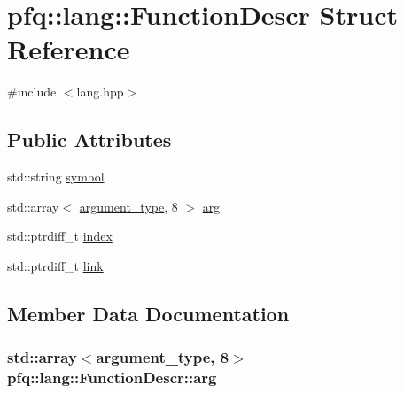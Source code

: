 \hypertarget{structpfq_1_1lang_1_1FunctionDescr}{}\section{pfq\+:\+:lang\+:\+:Function\+Descr Struct Reference}
\label{structpfq_1_1lang_1_1FunctionDescr}


{\ttfamily \#include $<$lang.\+hpp$>$}

\subsection*{Public Attributes}
\begin{DoxyCompactItemize}
\item 
std\+::string \hyperlink{structpfq_1_1lang_1_1FunctionDescr_a21f51c65f55dddd54de1171d8914c030}{symbol}
\item 
std\+::array$<$ \hyperlink{structpfq_1_1lang_1_1argument__type}{argument\+\_\+type}, 8 $>$ \hyperlink{structpfq_1_1lang_1_1FunctionDescr_af1fe3a86f26dc3f74532ce718a195006}{arg}
\item 
std\+::ptrdiff\+\_\+t \hyperlink{structpfq_1_1lang_1_1FunctionDescr_ae818027f48319f8f4f59d3c47202d883}{index}
\item 
std\+::ptrdiff\+\_\+t \hyperlink{structpfq_1_1lang_1_1FunctionDescr_a09e00f9d57300893f95661b56e6b114e}{link}
\end{DoxyCompactItemize}


\subsection{Member Data Documentation}
\subsubsection[{\texorpdfstring{arg}{arg}}]{\setlength{\rightskip}{0pt plus 5cm}std\+::array$<${\bf argument\+\_\+type}, 8$>$ pfq\+::lang\+::\+Function\+Descr\+::arg}\hypertarget{structpfq_1_1lang_1_1FunctionDescr_af1fe3a86f26dc3f74532ce718a195006}{}\label{structpfq_1_1lang_1_1FunctionDescr_af1fe3a86f26dc3f74532ce718a195006}
